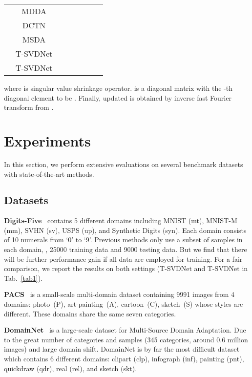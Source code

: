 \documentclass[10pt,twocolumn,letterpaper]{article}
\begin{document}
\begin{table*}[h]
\begin{center}
{\begin{tabular}{lccccccc}
				& MDDA              & {\color{green}} & {\color{green}} &  &  & {\color{green}} & {\color{green}}     \\
				& DCTN              &  &  &  &  &  &       \\
				& MSDA             &  &  & {\color{green}} & {\color{green}} &  &       \\
& T-SVDNet & {\color{blue}}      & {\color{blue}}      & {\color{blue}}      & {\color{blue}}      & {\color{blue}}      & {\color{blue}}      \\
				& T-SVDNet          & {\color{blue}}     & {\color{blue}}      & {\color{blue}}            & {\color{blue}}      & {\color{blue}}      & {\color{blue}}           \\
				\bottomrule[1.5pt]
			\end{tabular}
		}	
	\end{center}
	\caption{{\small{Classification results on Digits-Five. The top value is highlighted in {\color{blue}{blue}} bold font and the second best in {\color{green} green} bold font.}}}
	\label{tab1}
\end{table*}

where {\small{}} is singular value shrinkage operator. {\small{}} is a diagonal matrix with the -th diagonal element to be {\small}. Finally, updated  is obtained by inverse fast Fourier transform from .

\section{Experiments}
In this section, we perform extensive evaluations on several benchmark datasets with state-of-the-art methods. 
\subsection{Datasets}
\textbf{Digits-Five}~\cite{hull1994database} contains 5 different domains including MNIST (mt), MNIST-M (mm), SVHN (sv), USPS (up), and Synthetic Digits (syn). Each domain consists of 10 numerals from `0' to `9'. Previous methods only use a subset of samples in each domain, \ie, 25000 training data and 9000 testing data. But we find that there will be further performance gain if all data are employed for training. For a fair comparison, we report the results on both settings (T-SVDNet and T-SVDNet in Tab.~\ref{tab1}).\par
\textbf{PACS}~\cite{li2017deeper} is a small-scale multi-domain dataset containing 9991 images from 4 domains: photo~(P), art-painting~(A), cartoon~(C), sketch~(S) whose styles are different. These domains share the same seven categories.\par
\textbf{DomainNet}~\cite{peng2019moment} is a large-scale dataset for Multi-Source Domain Adaptation. Due to the great number of categories and samples (345 categories, around 0.6 million images) and large domain shift. DomainNet is by far the most difficult dataset which contains 6 different domains: clipart (clp), infograph (inf), painting (pnt), quickdraw (qdr), real (rel), and sketch (skt).
\end{document}
